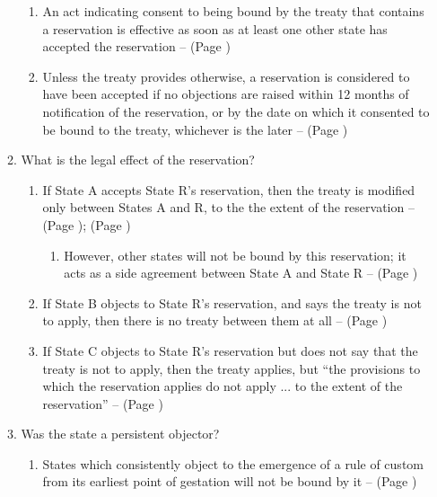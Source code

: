 \begin{enumerate}
\begin{enumerate}
\begin{enumerate}
            \item An act indicating consent to being bound by the treaty that contains a reservation is effective as soon as at least one other state has accepted the reservation --  (Page \pageref{VCLT Art 20})
            \item Unless the treaty provides otherwise, a reservation is considered to have been accepted if no objections are raised within 12 months of notification of the reservation, or by the date on which it consented to be bound to the treaty, whichever is the later --  (Page \pageref{VCLT Art 20})
        \end{enumerate}
        \item What is the legal effect of the reservation?
        \begin{enumerate}
            \item If State A accepts State R's reservation, then the treaty is modified only between States A and R, to the the extent of the reservation --  (Page \pageref{VCLT Art 21});  (Page \pageref{case:India v CCDM})
            \begin{enumerate}
                \item However, other states will not be bound by this reservation; it acts as a side agreement between State A and State R --  (Page \pageref{VCLT Art 21})
            \end{enumerate}
            \item If State B objects to State R's reservation, and says the treaty is not to apply, then there is no treaty between them at all --  (Page \pageref{VCLT Art 20})
            \item If State C objects to State R's reservation but does not say that the treaty is not to apply, then the treaty applies, but “the provisions to which the reservation applies do not apply ... to the extent of the reservation” --  (Page \pageref{VCLT Art 21})
        \end{enumerate}
        \item Was the state a persistent objector?
        \begin{enumerate}
            \item States which consistently object to the emergence of a rule of custom from its earliest point of gestation will not be bound by it --  (Page \pageref{case:UK v Norway Fisheries})

\end{enumerate}
\end{enumerate}
\end{enumerate}
